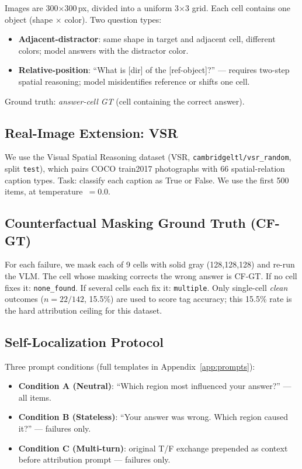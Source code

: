 \documentclass[11pt]{article}
\begin{document}
Images are 300$\times$300\,px, divided into a uniform 3$\times$3 grid.
Each cell contains one object (shape $\times$ color).
Two question types:

\begin{itemize}
  \item \textbf{Adjacent-distractor}: same shape in target and adjacent cell,
    different colors; model answers with the distractor color.
  \item \textbf{Relative-position}: ``What is [dir] of the [ref-object]?'' —
    requires two-step spatial reasoning; model misidentifies reference or shifts
    one cell.
\end{itemize}

\noindent Ground truth: \emph{answer-cell GT} (cell containing the correct answer).

\subsection{Real-Image Extension: VSR}

We use the Visual Spatial Reasoning dataset \citep{liu-2023-vsr}
(VSR, \texttt{cambridgeltl/vsr\_random}, split \texttt{test}),
which pairs COCO train2017 photographs with 66 spatial-relation caption types.
Task: classify each caption as True or False.
We use the first 500 items, at temperature~$= 0.0$.

\subsection{Counterfactual Masking Ground Truth (CF-GT)}

For each failure, we mask each of 9 cells with solid gray (128,128,128)
and re-run the VLM.
The cell whose masking corrects the wrong answer is CF-GT.
If no cell fixes it: \texttt{none\_found}.
If several cells each fix it: \texttt{multiple}.
Only single-cell \emph{clean} outcomes ($n{=}22/142$, 15.5\%) are used to score
tag accuracy; this 15.5\% rate is the hard attribution ceiling for this dataset.

\subsection{Self-Localization Protocol}

Three prompt conditions (full templates in Appendix~\ref{app:prompts}):

\begin{itemize}
  \item \textbf{Condition A (Neutral)}: ``Which region most influenced your answer?''
    — all items.
  \item \textbf{Condition B (Stateless)}: ``Your answer was wrong. Which region
    caused it?'' — failures only.
  \item \textbf{Condition C (Multi-turn)}: original T/F exchange prepended as
    context before attribution prompt — failures only.
\end{itemize}
\end{document}
